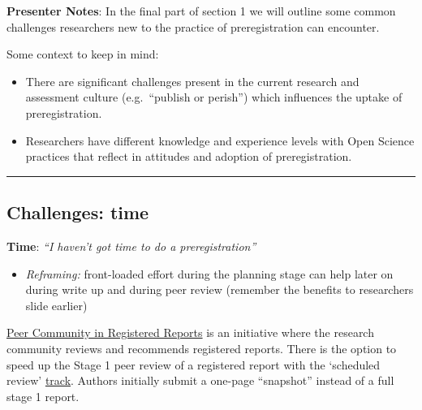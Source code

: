 \documentclass[
  letterpaper,
  DIV=11,
  numbers=noendperiod]{scrartcl}
\providecommand{\tightlist}{%
  \setlength{\itemsep}{0pt}\setlength{\parskip}{0pt}}
\begin{document}
\textbf{Presenter Notes}: In the final part of section 1 we will outline
some common challenges researchers new to the practice of
preregistration can encounter.

Some context to keep in mind:

\begin{itemize}
\item
  There are significant challenges present in the current research and
  assessment culture (e.g.~``publish or perish'') which influences the
  uptake of preregistration.
\item
  Researchers have different knowledge and experience levels with Open
  Science practices that reflect in attitudes and adoption of
  preregistration.
\end{itemize}

\begin{center}\rule{0.5\linewidth}{0.5pt}\end{center}

\subsection{Challenges: time}\label{challenges-time}

\textbf{Time}: \emph{``I haven't got time to do a preregistration''}

\begin{itemize}
\tightlist
\item
  \emph{Reframing:} front-loaded effort during the planning stage can
  help later on during write up and during peer review (remember the
  benefits to researchers slide earlier)
\end{itemize}

\begin{tcolorbox}[enhanced jigsaw, arc=.35mm, bottomrule=.15mm, bottomtitle=1mm, breakable, colback=white, colbacktitle=quarto-callout-note-color!10!white, colframe=quarto-callout-note-color-frame, coltitle=black, left=2mm, leftrule=.75mm, opacityback=0, opacitybacktitle=0.6, rightrule=.15mm, title=\textcolor{quarto-callout-note-color}{\faInfo}\hspace{0.5em}{Did you know?}, titlerule=0mm, toprule=.15mm, toptitle=1mm]

\href{https://rr.peercommunityin.org/PCIRegisteredReports/}{Peer
Community in Registered Reports} is an initiative where the research
community reviews and recommends registered reports. There is the option
to speed up the Stage 1 peer review of a registered report with the
`scheduled review'
\href{https://rr.peercommunityin.org/help/guide_for_reviewers\#h_61998243643551613309672490}{track}.
Authors initially submit a one-page ``snapshot'' instead of a full stage
1 report.

\end{tcolorbox}
\end{document}
